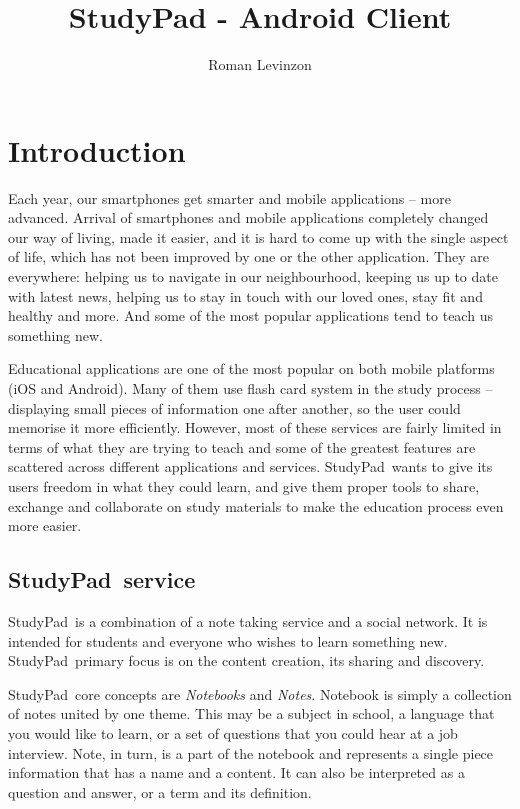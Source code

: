 \documentclass[thesis=B,english]{FITthesis}[2012/10/20]
\title{StudyPad - Android Client}
\author{Roman Levinzon} %
\newcommand{\appname}{StudyPad}
\begin{document}

\chapter{Introduction}

Each year, our smartphones get smarter and mobile applications -- more advanced. Arrival of smartphones and mobile applications completely changed our way of living, made it easier, and it is hard to come up with the single aspect of life, which has not been improved by one or the other application. They are everywhere: helping us to navigate in our neighbourhood, keeping us up to date with latest news, helping us to stay in touch with our loved ones, stay fit and healthy and more. And some of the most popular applications tend to teach us something new.	

Educational applications are one of the most popular on both mobile platforms (iOS and Android). Many of them use flash card system in the study process -- displaying small pieces of information one after another, so the user could memorise it more efficiently. However, most of these services are fairly limited in terms of what they are trying to teach and some of the greatest  features are scattered across different applications and services. \appname\ wants to give its users freedom in what they could learn, and give them proper tools to share, exchange and collaborate on study materials to make the education process even more easier.

\section{\appname\ service}
\appname\ is a combination of a note taking service and a social network. It is intended for students and everyone who wishes to learn something new. \appname\ primary focus is on the content creation, its sharing and discovery.

\appname\ core concepts are \textit{Notebooks} and \textit{Notes}. Notebook is simply a collection of notes united by one theme. This may be a subject in school, a language that you would like to learn, or a set of questions that you could hear at a job interview. Note, in turn, is a part of the notebook and represents a single piece information that has a name and a content. It can also be interpreted as a question and answer, or a term and its definition.
\\
\end{document}
